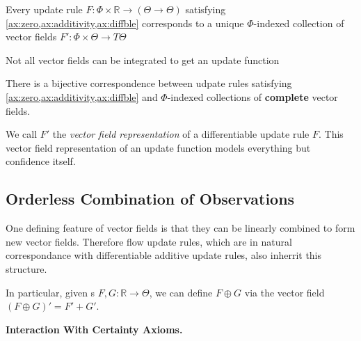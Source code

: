 \begin{theorem}
Every update rule $F : \Phi \times \mathbb R \to (\Theta  \to \Theta)$
satisfying \cref{ax:zero,ax:additivity,ax:diffble} corresponds to a unique
$\Phi$-indexed collection of vector fields
    $F' : \Phi \times \Theta \to T\Theta$
\end{theorem}

Not all vector fields can be integrated to get an update function

\begin{coro}\label{thm:vecrep}
There is a bijective correspondence between udpate rules satisfying \cref{ax:zero,ax:additivity,ax:diffble} and $\Phi$-indexed collections of \textbf{complete} vector fields.
\end{coro}


We call $F'$ the \emph{vector field representation} of a differentiable update rule $F$. 
This vector field representation of an update function models everything but confidence itself.


\subsection{Orderless Combination of Observations}

One defining feature of vector fields is that they
can be linearly combined to form new vector fields.
Therefore flow update rules, which are in natural correspondance with differentiable additive update rules, also inherrit this structure.

In particular, given \cofunc s $F, G : \mathbb R \to \Theta$, we can define
$F \oplus G$ via the vector field $(F \oplus G)' = F' + G'$.

\begin{wip}
\textbf{Interaction With Certainty Axioms.}

\end{wip}


